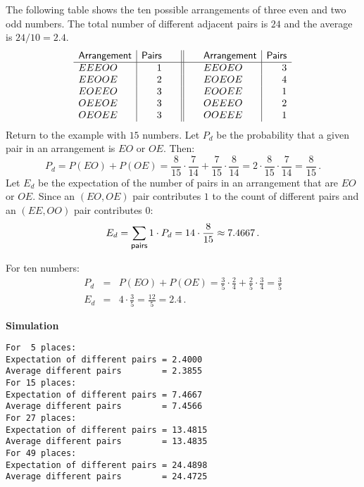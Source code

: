 The following table shows the ten possible arrangements of three even and two odd numbers. The total number of different adjacent pairs is $24$ and the average is $24/10=2.4$.
\[
\begin{array}{l|r@{\hspace{2em}}|@{\hspace{2pt}}|@{\hspace{2em}}l|r}
\textsf{Arrangement}&\textsf{Pairs}&\textsf{Arrangement}&\textsf{Pairs}\\\hline
EEEOO & 1&
EEOEO & 3\\
EEOOE & 2&
EOEOE & 4\\
EOEEO & 3&
EOOEE & 1\\
OEEOE & 3&
OEEEO & 2\\
OEOEE & 3&
OOEEE & 1\\
\end{array}
\]
Return to the example with $15$ numbers. Let $P_d$ be the probability that a given pair in an arrangement is $EO$ or $OE$.  Then:
\[
P_d =P(EO) + P(OE) = \frac{8}{15}\cdot \frac{7}{14} + \frac{7}{15}\cdot \frac{8}{14} = 2\cdot \frac{8}{15}\cdot \frac{7}{14} = \frac{8}{15}\,.
\]
Let $E_d$ be the expectation of the number of pairs in an arrangement that are $EO$ or $OE$. Since an $(EO,OE)$ pair contributes $1$ to the count of different pairs and an $(EE,OO)$ pair contributes $0$:
\[
E_d =
\sum_{\textsf{\footnotesize pairs}} 1\cdot P_d= 14\cdot \frac{8}{15} \approx 7.4667\,.
\]

For ten numbers:
\begin{eqnarray*}
P_d &=& P(EO) + P(OE) = \frac{3}{5}\cdot \frac{2}{4} + \frac{2}{5}\cdot \frac{3}{4} = \frac{3}{5}\\
E_d &=& 4\cdot \frac{3}{5}=\frac{12}{5}=2.4\,.
\end{eqnarray*}

\textbf{Simulation}
\begin{verbatim}
For  5 places:
Expectation of different pairs = 2.4000
Average different pairs        = 2.3855
For 15 places:
Expectation of different pairs = 7.4667
Average different pairs        = 7.4566
For 27 places:
Expectation of different pairs = 13.4815
Average different pairs        = 13.4835
For 49 places:
Expectation of different pairs = 24.4898
Average different pairs        = 24.4725
\end{verbatim}


